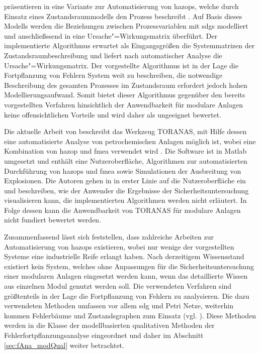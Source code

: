 \citeauthor{Boonthum_2014} pr\"asentieren in  eine Variante zur Automatisierung von \acp{hazop}, welche durch Einsatz eines Zustandsraummodells den Prozess beschreibt \cite{Boonthum_2014}. Auf Basis dieses Modells werden die Beziehungen zwischen Prozessvariablen mit \acp{sdg} modelliert und anschlie\ss{}ssend in eine Ursache"=Wirkungsmatrix \"uberf\"uhrt. Der implementierte Algorithmus erwartet als Eingangsgr\"o\ss{}en die Systemmatrizen der Zustandsraumbeschreibung und liefert nach automatischer Analyse die Ursache"=Wirkungsmatrix. Der vorgestellte Algorithmus ist in der Lage die Fortpflanzung von Fehlern System weit zu beschreiben, die notwendige Beschreibung des gesamten Prozesses im Zustandsraum erfordert jedoch hohen Modellierungsaufwand. Somit bietet dieser Algorithmus gegen\"uber den bereits vorgestellten Verfahren hinsichtlich der Anwendbarkeit f\"ur modulare Anlagen keine offensichtlichen Vorteile und wird daher als ungeeignet bewertet. 

Die aktuelle Arbeit von \citeauthor{Mechhoud_2016} beschreibt das Werkzeug TORANAS, mit Hilfe dessen eine automatisierte Analyse von petrochemischen Anlagen m\"oglich ist, wobei eine Kombination von \ac{hazop} und \ac{fmea} verwendet wird \cite{Mechhoud_2016}. Die Software ist in Matlab umgesetzt und enth\"alt eine Nutzeroberfl\"ache, Algorithmen zur automatisierten Durchf\"uhrung von \acp{hazop} und \ac{fmea} sowie Simulationen der Ausbreitung von Explosionen. Die Autoren gehen in  in erster Linie auf die Nutzeroberfl\"ache ein und beschreiben, wie der Anwender die Ergebnisse der Sicherheitsuntersuchung visualisieren kann, die implementierten Algorithmen werden nicht erl\"autert. In Folge dessen kann die Anwendbarkeit von TORANAS f\"ur modulare Anlagen nicht fundiert bewertet werden.

Zusammenfassend l\"asst sich feststellen, dass zahlreiche Arbeiten zur Automatisierung von \acp{hazop} existieren, wobei nur wenige der vorgestellten Systeme eine industrielle Reife erlangt haben. Nach derzeitigem Wissensstand existiert kein System, welches ohne Anpassungen f\"ur die Sicherheitsuntersuchung einer modularen Anlagen eingesetzt werden kann, wenn das detaillierte Wissen aus einzelnen Modul genutzt werden soll. \newline
Die verwendeten Verfahren sind gr\"o\ss{}tenteils in der Lage die Fortpflanzung von Fehlern zu analysieren. Die dazu verwendeten Methoden umfassen vor allem \ac{sdg} und Petri Netze, weiterhin kommen Fehlerb\"aume und Zustandsgraphen zum Einsatz {(vgl. \cite[S. 3]{Palmer_2009} )}. Diese Methoden werden in die Klasse der modellbasierten qualitativen Methoden der Fehlerfortpflanzungsanalyse eingeordnet und daher im Abschnitt \ref{sec:fAna_modQual} weiter betrachtet. 

